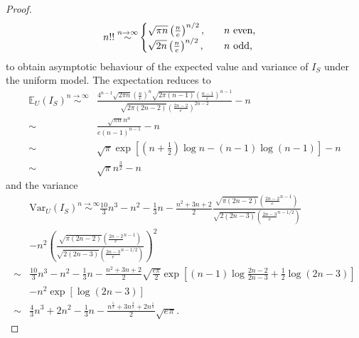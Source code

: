 \begin{proof}
\begin{align}
        n!! \stackrel{n\to\infty}{\sim} &
        \begin{cases}
            \sqrt{\pi n}\left(\frac{n}{e}\right)^{n/2},&\text{\quad $n$ even,}\\
            \sqrt{2n}\left(\frac{n}{e}\right)^{n/2}, &\text{\quad $n$ odd,}
        \end{cases}
    \end{align}
    to obtain asymptotic behaviour of the expected value and variance of $I_S$
    under the uniform model. The expectation reduces to
    \begin{align*}
        \mathbb{E}_U(I_S)\stackrel{n\to\infty}{\sim}& \frac{4^{n-1}\sqrt{2\pi n}
        \left(\frac{n}{e}\right)^n \sqrt{2\pi (n-1)}\left(\frac{n-1}{e}
        \right)^{n-1}}{\sqrt{2\pi (2n-2)}\left( \frac{2n-2}{e} \right)^{2n-2}}
        - n \\
        \sim & \frac{\sqrt{\pi n}n^n}{e(n-1)^{n-1}}-n\\
        \sim & \sqrt{\pi} \exp\left[ (n+\frac{1}{2})\log n - (n-1)\log(n-1)
        \right] - n\\
        \sim & \sqrt{\pi} n^{\frac{3}{2}} - n
    \end{align*}
    and the variance
    \begin{align*}
        & \text{Var}_U(I_S)  \stackrel{n\to\infty}{\sim}  \frac{10}{3}n^3 - n^2
        - \frac{1}{3}n - \frac{n^2 + 3n +2}{2}\frac{\sqrt{\pi (2n-2)}\left(
        \frac{2n-2}{e}^{n-1} \right)}{\sqrt{2 (2n-3)}\left( \frac{2n-3}{e}^{n-1/2}
        \right)}\\
        &-  n^2\left( \frac{\sqrt{\pi (2n-2)}\left( \frac{2n-2}{e}^{n-1} \right)}
        {\sqrt{2 (2n-3)}\left( \frac{2n-3}{e}^{n-1/2} \right)} \right)^2\\
        \sim & \frac{10}{3}n^3 - n^2 - \frac{1}{3}n - \frac{n^2+3n+2}{2}
        \sqrt{\frac{e\pi}{2}}\exp\left[(n-1)\log\frac{2n-2}{2n-3}+
        \frac{1}{2}\log(2n-3)\right] \\
        &- n^2\exp\left[ \log(2n-3) \right]\\
        \sim & \frac{4}{3}n^3 + 2n^2 - \frac{1}{3}n - \frac{n^\frac{5}{2}+
        3n^\frac{3}{2}+2n^\frac{1}{2}}{2}\sqrt{e\pi}.
    \end{align*}
\end{proof}

